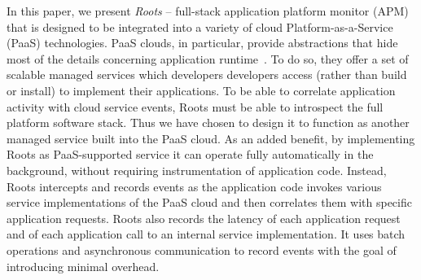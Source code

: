 In this paper, we present \textit{Roots} --  
full-stack application platform 
monitor (APM) that is designed to be integrated
into a variety of cloud Platform-as-a-Service (PaaS) technologies. 
PaaS clouds, in particular, provide abstractions that hide most of the 
details concerning application
runtime~\cite{Soni:2014:CCB:2592737.2592741}. 
To do so, they offer a set of scalable managed services
which developers developers access (rather than build or install) 
to implement their applications.
To be able to correlate application activity with cloud service events,
Roots must be able to introspect the full platform software stack.  Thus we
have chosen to design it to function
as another managed service built into the PaaS cloud. 
As an added benefit, by implementing Roots as PaaS-supported service
it can operate fully automatically in the background, without
requiring instrumentation of application code. Instead,
Roots intercepts and records events as the
application code invokes various service implementations of the PaaS cloud
and then correlates them with specific application requests.
Roots also records the latency of each application request and
of each application call to an
internal service implementation. It uses batch operations and asynchronous 
communication to record events with the goal of introducing minimal overhead.


